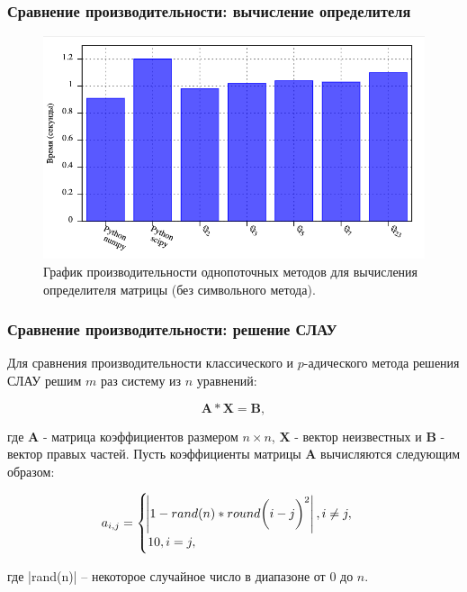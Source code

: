 \documentclass[10pt,professionalfont,utf8,presentation,compress]{beamer}
\theoremstyle{definition}
\theoremstyle{plain}
\begin{document}
\begin{frame}
\frametitle{Сравнение производительности: вычисление определителя}
\begin{figure}[H]
\centerline{\includegraphics[width=0.95\linewidth]{../gnuplot/single/det/wosymb.png}}
\caption{График производительности однопоточных методов для вычисления определителя матрицы (без символьного метода).}
\label{img:single:det:2}
\end{figure}
\end{frame}


\begin{frame}
\frametitle{Сравнение производительности: решение СЛАУ}
Для сравнения производительности классического и $p$-адического метода решения СЛАУ решим $m$ раз систему из $n$ уравнений:

\begin{equation}
\boldsymbol{A}*\boldsymbol{X}=\boldsymbol{B},
\end{equation}

\noindent где $\boldsymbol{A}$ - матрица коэффициентов размером $n \times n$, $\boldsymbol{X}$ - вектор неизвестных и $\boldsymbol{B}$ - вектор правых частей.
Пусть коэффициенты матрицы $\boldsymbol{A}$ вычисляются следующим образом:

\begin{equation}
a_{i,j}=
\begin{cases}
\abs{1-rand(n)*round\bigg(i-j\bigg)^2}, i \neq j, \\
10, i = j,
\end{cases}
\end{equation}

\noindent где |rand(n)| -- некоторое случайное число в диапазоне от $0$ до $n$.
\end{frame}
\end{document}
